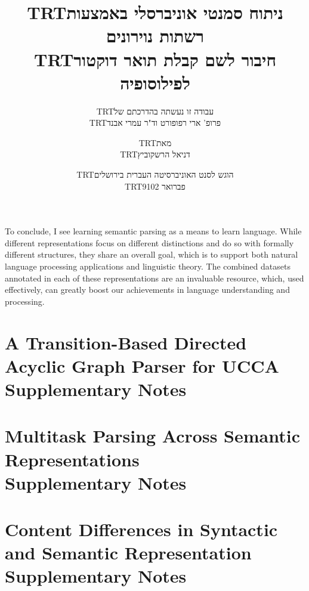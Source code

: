 \documentclass[12pt,a4paper]{report}
\newcommand{\heb}[1]{\bgroup\textdir TRT\hebfont #1\egroup}
\begin{document}
To conclude, I see learning semantic parsing as a means to learn language.
While different representations focus on different distinctions and do so
with formally different structures, they share an overall goal,
which is to support both natural language processing applications and linguistic
theory.
The combined datasets annotated in each of these representations are an invaluable
resource, which, used effectively, can greatly boost our achievements in
language understanding and processing.




\appendix

\chapter{A Transition-Based Directed Acyclic Graph Parser for UCCA \\ Supplementary Notes}



\chapter{Multitask Parsing Across Semantic Representations \\ Supplementary Notes}



\chapter{Content Differences in Syntactic and Semantic Representation \\ Supplementary Notes}



\pagebreak

\section*{\flushright{\heb{תקציר}}}

\pagebreak

\clearpage

\title{}
\author{
\heb{עבודה זו נעשתה בהדרכתם של} \\
\heb{פרופ' ארי רפופורט וד"ר עמרי אבנד}}
\date{}

\maketitle
\clearpage

\title{
\textbf{\heb{ניתוח סמנטי אוניברסלי באמצעות רשתות נוירונים}} \\
\vspace{2cm}
{\large\heb{חיבור לשם קבלת תואר דוקטור לפילוסופיה}}
}
\author{
\heb{מאת}\\
\heb{דניאל הרשקוביץ}
\vspace{2cm}
}
\date{
\heb{הוגש לסנט האוניברסיטה העברית בירושלים} \\
\heb{פברואר 9102}
}

\maketitle
\maketitle
\end{document}
